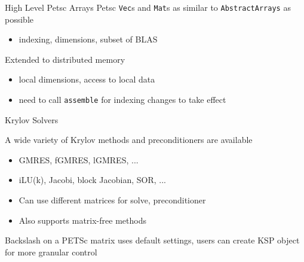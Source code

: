 \documentclass{beamer}
\begin{document}
\begin{comment}
\begin{frame}[fragile]{The Rewriter}
For each Petsc object, introduce a Julia immutable type
\begin{itemize}
  \item Parameterize on datatype \texttt{T} to enable dispatch
\end{itemize}
\begin{verbatim}
  typealias Mat Ptr{_p_Mat} -> immutable Mat{T}
\end{verbatim}
\hfill

Also map C equivalent types to more general types:
\begin{verbatim} 
  Ptr{Float64} -> Union{DenseArray{Float64},
                        Ptr{Float64}, Ref{Float64}}
\end{verbatim}
\hfill

Implemented with a recursive descent search and replace on the \texttt{Expr}s 
generated by Clang.jl

\end{frame}
\end{comment}

\begin{frame}[fragile]{High Level Petsc Arrays}
Petsc \texttt{Vec}s and \texttt{Mat}s as similar to \texttt{AbstractArrays} as possible
\begin{itemize}
  \item indexing, dimensions, subset of BLAS
\end{itemize}
\hfill


Extended to distributed memory
\begin{itemize}
  \item local dimensions, access to local data
  \item need to call \texttt{assemble} for indexing changes to take effect
\end{itemize}

\end{frame}

\begin{frame}{Krylov Solvers}
\hfill

A wide variety of Krylov methods and preconditioners are available
\begin{itemize}
  \item GMRES, fGMRES, lGMRES, ...
  \item iLU(k), Jacobi, block Jacobian, SOR, ...
  \item Can use different matrices for solve, preconditioner
  \item Also supports matrix-free methods
\end{itemize}
\hfill

Backslash on a PETSc matrix uses default settings, users can create KSP object for more granular control
\end{frame}
\end{document}
